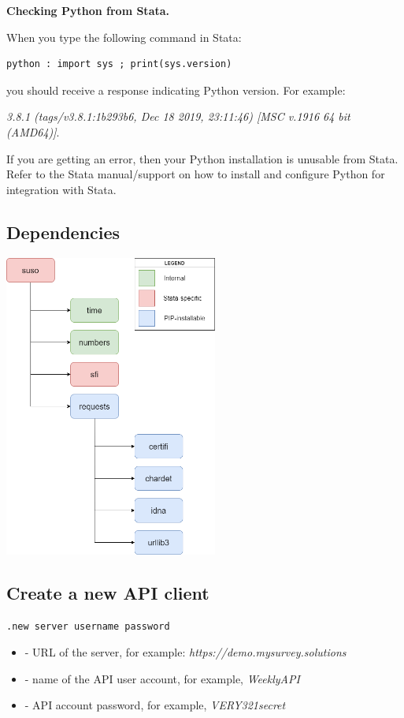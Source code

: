 \vskip16pt
\textbf{Checking Python from Stata.}\par
\vskip16pt
When you type the following command in Stata:\par
\vskip16pt
\begin{lstlisting}
python : import sys ; print(sys.version)
\end{lstlisting}
\vskip16pt
you should receive a response indicating Python version. For example: \par
\vskip16pt
\textit{3.8.1 (tags/v3.8.1:1b293b6, Dec 18 2019, 23:11:46) [MSC v.1916 64 bit (AMD64)]}.\par
\vskip16pt
If you are getting an error, then your Python installation is unusable from Stata. Refer to the Stata manual/support on how to install and configure Python for integration with Stata.


\vskip16pt
\subsection{Dependencies}
\begin{center}
    \includegraphics[width=70mm]{images/generated/susoapi-dependencies.png}
\end{center}


\vskip16pt
\subsection{Create a new API client}
\begin{lstlisting}
.new server username password
\end{lstlisting}

\paramsheader
\begin{itemize}
\item {} - URL of the server, for example: \textquotedbl\textit{https://demo.mysurvey.solutions}\textquotedbl
\item {} - name of the API user account, for example, \textquotedbl\textit{WeeklyAPI}\textquotedbl
\item {} - API account password, for example, \textquotedbl\textit{VERY321secret}\textquotedbl
\end{itemize}
